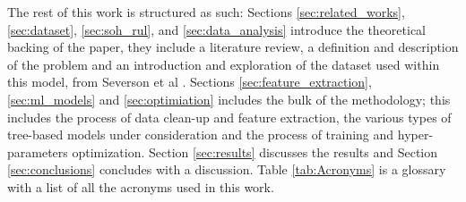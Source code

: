 The rest of this work is structured as such: Sections \ref{sec:related_works}, \ref{sec:dataset}, \ref{sec:soh_rul}, and \ref{sec:data_analysis} introduce the theoretical backing of the paper, they include a literature review, a definition and description of the problem and an introduction and exploration of the dataset used within this model, from Severson et al \cite{sev2019}. Sections \ref{sec:feature_extraction}, \ref{sec:ml_models} and \ref{sec:optimiation} includes the bulk of the methodology; this includes the process of data clean-up and feature extraction, the various types of tree-based models under consideration and the process of training and hyper-parameters optimization. Section \ref{sec:results} discusses the results and Section \ref{sec:conclusions} concludes with a discussion. Table  \ref{tab:Acronyms} is a glossary with a list of all the acronyms used in this work.

\begin{table}[]
    \centering
    \printacronyms[template=tabular, name=Glossary]
    \caption{List of Acronyms found in this work.}
    \label{tab:Acronyms}
\end{table}


